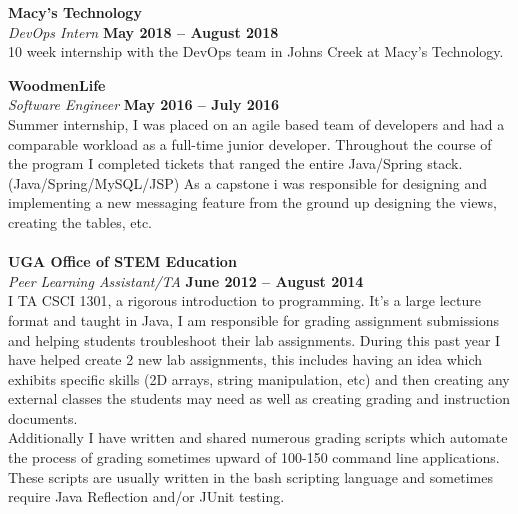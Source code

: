 \documentclass[margin,line]{resume}
\begin{document}
\begin{resume}
    \textbf{\listing Macy's Technology} \vspace{2mm}\\\vspace{1mm}%
    \textsl{DevOps Intern} \hfill \textbf{May 2018 -- August 2018}\\
    10 week internship with the DevOps team in Johns Creek at Macy's Technology.

    \textbf{\listing WoodmenLife} \vspace{2mm}\\\vspace{1mm}%
    \textsl{Software Engineer} \hfill \textbf{May 2016 -- July 2016}\\
    Summer internship, I was placed on an agile based team of developers and
had a comparable workload as a full-time junior developer.
Throughout the course of the program I completed tickets that ranged the entire
Java/Spring stack. (Java/Spring/MySQL/JSP)
As a capstone i was responsible for designing and implementing a new messaging feature from the ground up
designing the views, creating the tables, etc.
\\\\
    \textbf{\listing UGA Office of STEM Education} \vspace{2mm}\\\vspace{1mm}%
    \textsl{Peer Learning Assistant/TA} \hfill \textbf{June 2012 -- August 2014}\\
    I TA CSCI 1301, a rigorous introduction to programming. It's a large lecture format and taught in Java, I am responsible for
grading assignment submissions and helping students troubleshoot their lab assignments.
During this past year I have helped create 2 new lab assignments, this includes having an idea which exhibits specific skills (2D arrays, string manipulation, etc) and then creating any external classes the students may need as well as creating grading and instruction documents.\\ 
Additionally I have written and shared numerous grading scripts which automate the process of grading sometimes upward of 100-150 command line applications. These scripts are usually written in the bash scripting language and sometimes require Java Reflection and/or JUnit testing.


\sectionline

   

\end{resume}
\end{document}
